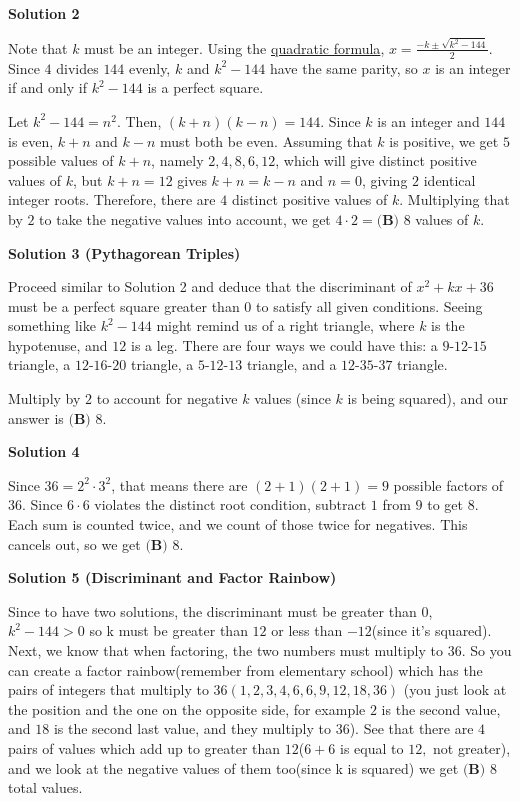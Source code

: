 \begin{enumerate}
 



\textbf{Solution 2}

Note that $k$ must be an integer. Using the \href{https://artofproblemsolving.com/wiki/index.php?title=Quadratic\_formula}{quadratic formula}, $x=\frac{-k \pm \sqrt{k^2-144}}{2}.$ Since $4$ divides $144$ evenly, $k$ and $k^2-144$ have the same parity, so $x$ is an integer if and only if $k^2-144$ is a perfect square.

 Let $k^2-144=n^2.$ Then, $(k+n)(k-n)=144.$ Since $k$ is an integer and $144$ is even, $k+n$ and $k-n$ must both be even. Assuming that $k$ is positive, we get $5$ possible values of $k+n$, namely $2, 4, 8, 6, 12$, which will give distinct positive values of $k$, but $k+n=12$ gives $k+n=k-n$ and $n=0$, giving $2$ identical integer roots. Therefore, there are $4$ distinct positive values of $k.$ Multiplying that by $2$ to take the negative values into account, we get $4\cdot2=\boxed{\textbf{(B) }8}$ values of $k$.

 



\textbf{Solution 3 (Pythagorean Triples)}

Proceed similar to Solution 2 and deduce that the discriminant of $x^{2}+kx+36$ must be a perfect square greater than $0$ to satisfy all given conditions. Seeing something like $k^2-144$ might remind us of a right triangle, where $k$ is the hypotenuse, and $12$ is a leg. There are four ways we could have this: a $9$-$12$-$15$ triangle, a $12$-$16$-$20$ triangle, a $5$-$12$-$13$ triangle, and a $12$-$35$-$37$ triangle.

 Multiply by $2$ to account for negative $k$ values (since $k$ is being squared), and our answer is $\boxed{\textbf{(B) }8}$.

 



\textbf{Solution 4}

Since $36 = 2^2\cdot3^2$, that means there are $(2+1)(2+1) = 9$ possible factors of $36$. Since $6 \cdot 6$ violates the distinct root condition, subtract $1$ from $9$ to get $8$. Each sum is counted twice, and we count of those twice for negatives. This cancels out, so we get $\boxed{\textbf{(B) }8}$.

 



\textbf{Solution 5 (Discriminant and Factor Rainbow)}

Since to have two solutions, the discriminant must be greater than $0$, $k^2 - 144 > 0$ so k must be greater than $12$ or less than $-12$(since it's squared). Next, we know that when factoring, the two numbers must multiply to $36$. So you can create a factor rainbow(remember from elementary school) which has the pairs of integers that multiply to $36( 1, 2, 3, 4, 6, 6, 9, 12, 18, 36 )$ (you just look at the position and the one on the opposite side, for example $2$ is the second value, and $18$ is the second last value, and they multiply to 36). See that there are $4$ pairs of values which add up to greater than $12$($6+6$ is equal to $12,$ not greater), and we look at the negative values of them too(since k is squared) we get $\boxed{\textbf{(B) }8}$ total values.


\end{enumerate}
